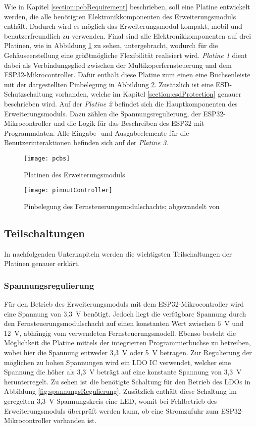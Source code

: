 Wie in Kapitel \ref{section:pcbRequirement} beschrieben, soll eine Platine entwickelt werden, die alle benötigten Elektronikkomponenten des Erweiterungsmoduls enthält. Dadurch wird es möglich das Erweiterungsmodul kompakt, mobil und benutzerfreundlich zu verwenden. Final sind alle Elektronikkomponenten auf drei Platinen, wie in Abbildung \ref{fig:pcbs} zu sehen, untergebracht, wodurch für die Gehäuseerstellung eine größtmögliche Flexibilität realisiert wird. \textit{Platine 1} dient dabei als Verbindungsglied zwischen der Multikoperfernsteuerung und dem ESP32-Mikrocontroller. Dafür enthält diese Platine zum einen eine Buchsenleiste mit der dargestellten Pinbelegung in Abbildung \ref{fig:pinoutController}. Zusätzlich ist eine ESD-Schutzschaltung vorhanden, welche im Kapitel \ref{section:esdProtection} genauer beschrieben wird. Auf der \textit{Platine 2} befindet sich die Hauptkomponenten des Erweiterungsmoduls. Dazu zählen die Spannungsregulierung, der ESP32-Mikrocontroller und die Logik für das Beschreiben des ESP32 mit Programmdaten. Alle Eingabe- und Ausgabeelemente für die Benutzerinteraktionen befinden sich auf der \textit{Platine 3}.

\begin{figure}[h]
    \centering
    \texttt{[image: pcbs]}
    \caption{Platinen des Erweiterungsmoduls}
    \label{fig:pcbs}
\end{figure}

\begin{figure}[h]
    \centering
    \texttt{[image: pinoutController]}
    \caption{Pinbelegung des Fernsteuerungsmodulschachts; abgewandelt von \cite{liteModulePinout}}
    \label{fig:pinoutController}
\end{figure}

\subsection{Teilschaltungen}
In nachfolgenden Unterkapiteln werden die wichtigsten Teilschaltungen der Platinen genauer erklärt.

\subsubsection{Spannungsregulierung}
Für den Betrieb des Erweiterungsmoduls mit dem ESP32-Mikrocontroller wird eine Spannung von 3,3~V benötigt. Jedoch liegt die verfügbare Spannung durch den Fernsteuerungsmodulschacht auf einen konstanten Wert zwischen 6~V und 12~V, abhängig vom verwendeten Fernsteuerungsmodell. Ebenso besteht die Möglichkeit die Platine mittels der integrierten Programmierbuchse zu betreiben, wobei hier die Spannung entweder 3,3~V oder 5~V betragen. Zur Regulierung der möglichen zu hohen Spannungen wird ein \ac{LDO} \ac{IC} verwendet, welcher eine Spannung die höher als 3,3~V beträgt auf eine konstante Spannung von 3,3~V herunterregelt. Zu sehen ist die benötigte Schaltung für den Betrieb des \acp{LDO} in Abbildung \ref{fig:spannungsRegulierung}. Zusätzlich enthält diese Schaltung im geregelten 3,3~V Spannungskreis eine \acs{LED}, womit bei Fehlbetrieb des Erweiterungsmoduls überprüft werden kann, ob eine Stromzufuhr zum ESP32-Mikrocontroller vorhanden ist.

